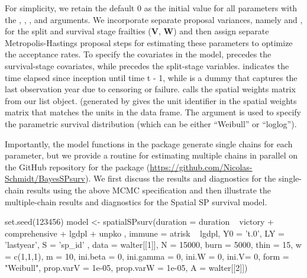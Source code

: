 For simplicity, we retain the default 0 as the initial value for all parameters with the , , , and  arguments. We incorporate separate proposal variances, namely  and , for the split and survival stage frailties (\textbf{V}, \textbf{W}) and then assign separate Metropolis-Hastings proposal steps for estimating these parameters to optimize the acceptance rates. To specify the covariates in the model,  precedes the survival-stage covariates, while  precedes the split-stage variables.  indicates the time elapsed since inception until time t - 1, while  is a dummy that captures the last observation year due to censoring or failure.  calls the spatial weights matrix from our list object.   (generated by  gives the unit identifier in the spatial weights matrix that matches the units in the data frame. The argument  is used to specify the parametric survival distribution (which can be either ``Weibull'' or ``loglog'').  

Importantly, the model functions in the  package generate single chains for each parameter, but we provide a routine for estimating multiple chains in parallel on the GitHub repository for the package (\url{https://github.com/Nicolas-Schmidt/BayesSPsurv}). We first discuss the results and diagnostics for the single-chain results using the above MCMC specification and then illustrate the multiple-chain results and diagnostics for the Spatial SP survival model. 

\begin{example}
set.seed(123456)
model <-  spatialSPsurv(duration = duration ~ victory + comprehensive + lgdpl + unpko ,
                            immune = atrisk ~ lgdpl,
                            Y0 = 't.0',
                            LY = 'lastyear',
                            S = 'sp_id' ,
                            data = walter[[1]],
                            N = 15000,
                            burn = 5000,
                            thin = 15,
                            w = c(1,1,1),
                            m = 10,
                            ini.beta =  0,
                            ini.gamma = 0,
                            ini.W = 0,
                            ini.V= 0,
                            form = "Weibull",
                            prop.varV = 1e-05,
                            prop.varW = 1e-05,
                            A = walter[[2]])
\end{example}

